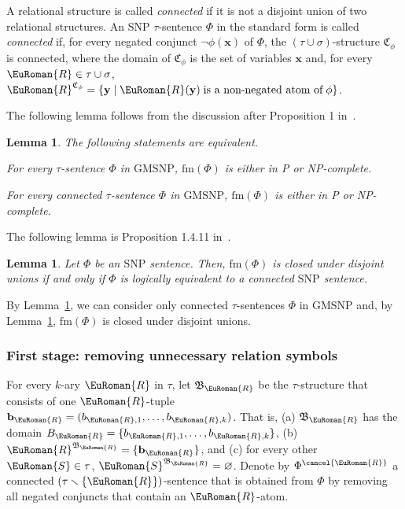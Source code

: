 \documentclass[10pt,a4paper]{amsart}
\theoremstyle{plain}
\newtheorem{lem}[thm]{Lemma}
\theoremstyle{definition}
\numberwithin{equation}{section}
\newcommand{\eurm}[1]{\EuRoman{#1}} %
\newcommand{\structure}[1]{\mathfrak{#1}} %
\newcommand{\tuple}[1]{\mathbf{#1}} %
\newcommand{\rel}[1]{\eurm{#1}} %
\newcommand{\Sat}[0]{\ensuremath{\mathrm{fm}}}
\newcommand{\SNP}[0]{\textrm{SNP}}
\newcommand{\GMSNP}[0]{\textrm{GMSNP}}
\renewcommand{\setminus}{\smallsetminus}
\begin{document}
A relational structure is called \emph{connected} if it is not a disjoint union of two relational structures.
An $\SNP$ $\tau$-sentence $\Phi$ in the standard form is called \emph{connected} if, for every negated conjunct $\neg\phi(\tuple{x})$ of $\Phi$, the $(\tau\cup\sigma)$-structure $\structure{C}_\phi$ is connected, where the domain of $\structure{C}_\phi$ is the set of variables $\tuple{x}$ and, for every $\rel{R}\in\tau\cup\sigma$, $\rel{R}^{\structure{C}_\phi} = \{\tuple{y}\mid \rel{R}(\tuple{y})\;\text{is a non-negated atom of}\; \phi\}$.

%
The following lemma follows from the discussion after Proposition 1 in~\cite{bodirsky_asnp}.
\begin{lem}\label{lemma:gmsnp_connected} 
The following statements are equivalent.
\begin{compactenum}
\item For every $\tau$-sentence $\Phi$ in $\GMSNP$, $\Sat(\Phi)$ is either in P or NP-complete.
\item For every connected $\tau$-sentence $\Phi$ in $\GMSNP$, $\Sat(\Phi)$ is either in P or NP-complete. 
\end{compactenum}
\end{lem}
The following lemma is Proposition 1.4.11 in~\cite{bodirsky_book}.
\begin{lem}\label{lem:snp_disjoint_union} 
Let $\Phi$ be an $\SNP$ sentence.
Then, $\Sat(\Phi)$ is closed under disjoint unions if and only if $\Phi$ is logically equivalent to a connected $\SNP$ sentence.
\end{lem}
By Lemma~\ref{lemma:gmsnp_connected}, we can consider only connected $\tau$-sentences $\Phi$ in $\GMSNP$ and, by Lemma~\ref{lem:snp_disjoint_union}, $\Sat(\Phi)$ is closed under disjoint unions.

\subsubsection*{First stage: removing unnecessary relation symbols} 
For every $k$-ary $\rel{R}$ in $\tau$, let $\structure{B}_\rel{R}$ be the $\tau$-structure that consists of one $\rel{R}$-tuple $\tuple{b}_\rel{R} = (b_{\rel{R},1},\ldots,b_{\rel{R},k})$. That is, (a) $\structure{B}_\rel{R}$ has the domain $B_\rel{R}=\{b_{\rel{R},1},\ldots,b_{\rel{R},k}\}$, (b) $\rel{R}^{\structure{B}_\rel{R}}=\{\tuple{b}_\rel{R}\}$, and (c) for every other $\rel{S}\in\tau$, $\rel{S}^{\structure{B}_\rel{R}}=\varnothing$.
Denote by $\Phi^{\cancel{\rel{R}}}$ a connected $(\tau\setminus\{\rel{R}\})$-sentence that is obtained from $\Phi$ by removing all negated conjuncts that contain an $\rel{R}$-atom.
\end{document}

